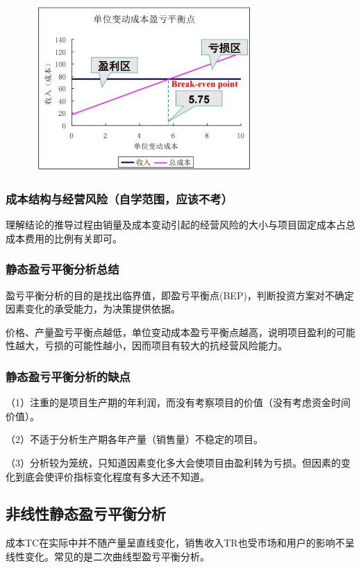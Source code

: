 \begin{figure}[H]
    \centering
    \includegraphics[width=0.75\textwidth]{image/单位变动成本盈亏平衡点.png}
    \label{fig:22}
\end{figure}

\subsubsection{成本结构与经营风险（自学范围，应该不考）}
理解结论的推导过程由销量及成本变动引起的经营风险的大小与项目固定成本占总成本费用的比例有关即可。

\subsubsection{静态盈亏平衡分析总结}
盈亏平衡分析的目的是找出临界值，即盈亏平衡点(BEP)，判断投资方案对不确定因素变化的承受能力，为决策提供依据。

价格、产量盈亏平衡点越低，单位变动成本盈亏平衡点越高，说明项目盈利的可能性越大，亏损的可能性越小，因而项目有较大的抗经营风险能力。

\subsubsection{静态盈亏平衡分析的缺点}
（1）注重的是项目生产期的年利润，而没有考察项目的价值（没有考虑资金时间价值）。

（2）不适于分析生产期各年产量（销售量）不稳定的项目。

（3）分析较为笼统，只知道因素变化多大会使项目由盈利转为亏损。但因素的变化到底会使评价指标变化程度有多大还不知道。

\subsection{非线性静态盈亏平衡分析}
成本TC在实际中并不随产量呈直线变化，销售收入TR也受市场和用户的影响不呈线性变化。常见的是二次曲线型盈亏平衡分析。

